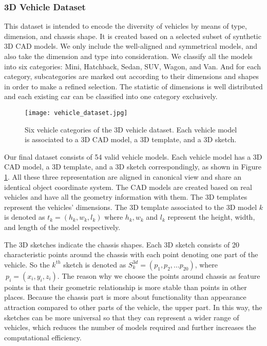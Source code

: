 \subsubsection{3D Vehicle Dataset}
\label{cad_models}
This dataset is intended to encode the diversity of vehicles by means of type, dimension, and chassis shape. It is created based on a selected subset of synthetic 3D CAD models\cite{NIPS2012_4562}. We only include the well-aligned and  symmetrical models, and also take the dimension and type into consideration. We classify all the models into six categories: Mini, Hatchback, Sedan, SUV, Wagon, and Van. And for each category,  subcategories are marked out according to their dimensions and shapes in order to make a refined selection.  The statistic of dimensions is well distributed and each existing car can be classified into one category exclusively.

\begin{figure}[h]		
	\texttt{[image: vehicle\_dataset.jpg]}
	\caption{Six vehicle categories of the 3D vehicle dataset. Each vehicle model is associated to a 3D CAD model, a 3D template, and a 3D sketch.}
	\centering
	\label{figure:vehicle_dataset}
\end{figure}

Our final dataset consists of 54 valid vehicle models. Each vehicle model has a 3D CAD model, a 3D template, and a 3D sketch correspondingly, as shown in Figure \ref{figure:vehicle_dataset}. All these three representation are aligned in canonical view and share an identical object coordinate system. The CAD models are created based on real vehicles and have all the geometry information with them. The 3D templates represent the vehicles' dimensions. The 3D template associated to the 3D model $k$ is denoted as $t_k = (h_k, w_k, l_k)$ where $h_k, w_k$ and $l_k$ represent the height, width, and length of the model respectively. 

The  3D sketches indicate the chassis shapes. Each 3D sketch consists of 20 characteristic points around the chassis with each point denoting one part of the vehicle. So the $k^{th}$ sketch is denoted as $S_k^{3d}  = (p_1, p_2, ... p_{20})$, where $~p_i = (x_i, y_i, z_i)$. The reason why we choose the points around chassis as feature points is that their geometric relationship is more stable than points in other places. Because the chassis part is more about functionality than appearance attraction compared to other parts of the vehicle,  \eg the upper part. In this way, the sketches can be more universal so that they can represent a wider range of vehicles, which reduces the number of models required and further increases the computational efficiency. 


